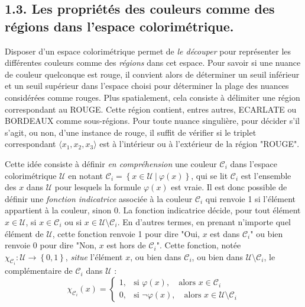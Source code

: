 \documentclass{article}
\begin{document}
\subsection*{1.3. 	Les propriétés des couleurs comme des régions dans l’espace colorimétrique.}
\par
Disposer d’un espace colorimétrique permet de \textit{le découper} pour représenter les différentes couleurs comme des \textit{régions} dans cet espace. Pour savoir si une nuance de couleur quelconque est rouge, il convient alors de déterminer un seuil inférieur et un seuil supérieur dans l’espace choisi pour déterminer la plage des nuances considérées comme rouges. Plus spatialement, cela consiste à délimiter une région correspondant au ROUGE. Cette région contient, entres autres, ECARLATE ou BORDEAUX comme sous-régions. Pour toute nuance singulière, pour décider s’il s’agit, ou non, d’une instance de rouge, il suffit de vérifier si le triplet correspondant $\langle x_1, x_2, x_3\rangle$ est à l’intérieur ou à l’extérieur de la région "ROUGE". 
\par
Cette idée consiste à définir \textit{en compréhension} une couleur $\mathcal{C}_i$ dans l’espace colorimétrique $\mathcal{U}$ en notant $\mathcal{C}_i=\left\{x\in\mathcal{U}\ |\ \varphi(x)\right\}$, qui se lit \og $\mathcal{C}_i$ est l’ensemble des $x$ dans $\mathcal{U}$ pour lesquels la formule $\varphi(x)$ est vraie. \fg Il est donc possible de définir une \textit{fonction indicatrice} associée à la couleur $\mathcal{C}_i$ qui renvoie 1 si l'élément appartient à la couleur, sinon 0. La fonction indicatrice décide, pour tout élément $x\in\mathcal{U}$, si $x\in\mathcal{C}_i$ ou si $x\in\mathcal{U}\setminus\mathcal{C}_i$. En d’autres termes, en prenant n’importe quel élément de $\mathcal{U}$, cette fonction renvoie 1 pour dire "Oui, $x$ est dans $\mathcal{C}_i$" ou bien renvoie 0 pour dire "Non, $x$ est hors de $\mathcal{C}_i$". Cette fonction, notée $\chi_{\mathcal{C}_i} : \mathcal{U} \rightarrow \left\{0, 1\right\}$, \textit{situe} l’élément $x$, ou bien dans $\mathcal{C}_i$, ou bien dans $\mathcal{U} \setminus \mathcal{C}_i$, le complémentaire de $\mathcal{C}_i$ dans $\mathcal{U}$ :
\vspace{-0.5em}
\[
\chi_{\mathcal{C}_i}(x) =
\left\{
\begin{array}{ll}
1, & \text{si } \varphi(x), \quad \text{alors } x \in \mathcal{C}_i \\
0, & \text{si } \neg\varphi(x), \quad \text{alors } x \in \mathcal{U} \setminus \mathcal{C}_i
\end{array}
\right.
\]
\end{document}
